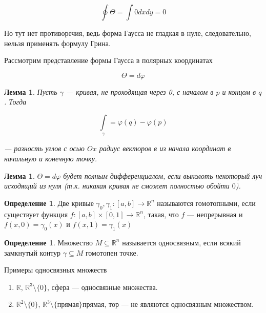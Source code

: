 \documentclass[a5paper]{article}
\newcounter{through}
\theoremstyle{plain}
\newtheorem{lemma}[through]{Лемма}
\theoremstyle{definition}
\newtheorem{definition}[through]{Определение}
\numberwithin{through}{section}
\numberwithin{equation}{section}
\begin{document}
\begin{equation*}
	\oint\limits \Theta = \int 0 dx dy = 0
\end{equation*}

Но тут нет противоречия, ведь форма Гаусса не гладкая в нуле, следовательно, нельзя применять формулу Грина. 

Рассмотрим представление формы Гаусса в полярных координатах

\begin{equation*}
	\Theta = d \varphi
\end{equation*}

\begin{lemma}
	Пусть $\gamma$ --- кривая, не проходящая через 0, с началом в $p$ и концом в $q$. Тогда 
	
	\begin{equation*}
		\int\limits_{\gamma} = \varphi(q) - \varphi(p)
	\end{equation*}
	
	--- разность углов с осью $Ox$ радиус векторов в из начала координат в начальную и конечную точку.
\end{lemma} 

\begin{lemma}
	$\Theta = d \varphi$ будет полным дифференциалом, если выколоть некоторый луч исходящий из нуля (т.к. никакая кривая не сможет полностью обойти $0$).
\end{lemma}

\begin{definition}
	Две кривые $\gamma_0, \gamma_1 : [a, b] \to \mathbb{R}^n$ называются гомотопными, если существует функция $f : [a, b] \times [0, 1] \to \mathbb{R}^n$, такая, что $f$ --- непрерывная и $f(x, 0) = \gamma_0(x)$ и $f(x, 1) = \gamma_1(x)$
\end{definition}

\begin{definition}
	Множество $M \subseteq \mathbb{R}^n$ называется односвязным, если всякий замкнутый контур $\gamma \subseteq M$ гомотопен точке.
\end{definition}

Примеры односвязных множеств

\begin{enumerate}
	\item $\mathbb{R}$, $\mathbb{R}^3 \setminus \{0\}$, сфера --- односвязные множества.
	
	\item $\mathbb{R}^2 \setminus \{0\}$, $\mathbb{R}^3 \setminus \{\text{прямая}\} прямая$, тор --- не являются односвязным множеством.
\end{enumerate}
\end{document}
